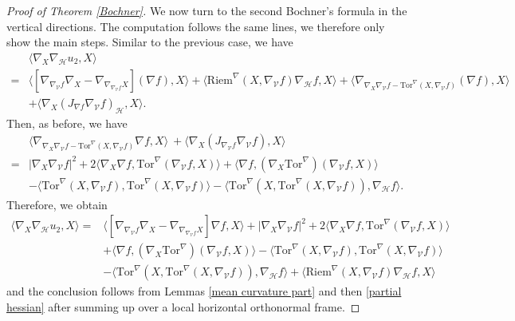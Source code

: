 \documentclass[11pt]{article}
\numberwithin{equation}{section}
\newcommand{\Ho}{\mathcal H}
\newcommand{\V}{\mathcal V}
\newcommand{\Tor}{\mathrm{Tor}}
\begin{document}
\begin{proof}[Proof of Theorem \ref{Bochner}]
        
        We now turn to the second Bochner's formula in the vertical directions. The computation follows the same lines, we therefore only show the main steps.  Similar to the previous case, we have
		\begin{align*}
			&\langle \nabla_X \nabla_{\mathcal{H}}u_2 ,X \rangle\\
			=&\langle[\nabla_{\nabla_\mathcal{V}f} \nabla_X-\nabla_{\nabla_{\nabla_\mathcal{V}f} X}] (\nabla f), X \rangle+\langle\mathrm{Riem}^{\nabla}(X, \nabla_{\mathcal{V}} f) \nabla_\Ho f, X\rangle+\langle \nabla_{\nabla_X \nabla_\mathcal{V}f-\Tor^{\nabla}(X, \nabla_\mathcal{V}f) } (\nabla f), X \rangle\\
			&+\langle \nabla_X (J_{\nabla f}\nabla_\mathcal{V}f)_{\mathcal{H}}, X \rangle.
		\end{align*} 
		Then, as before, we have
		\begin{align*}
			& \langle \nabla_{\nabla_X \nabla_\mathcal{V}f-\Tor^{\nabla}(X, \nabla_\mathcal{V}f) } \nabla f, X \rangle\
			+\langle \nabla_X (J_{\nabla_\V f}\nabla_\mathcal{V}f), X \rangle \\
			=&|\nabla_X \nabla_\mathcal{V}f  |^2+2\langle \nabla_X \nabla f, \Tor^\nabla(\nabla_{\mathcal{V}}f, X) \rangle+\langle \nabla f, (\nabla_X \Tor^\nabla)(\nabla_{\mathcal{V}}f, X) \rangle \\
			&-\langle \Tor^{\nabla}(X, \nabla_\mathcal{V}f) ,\Tor^{\nabla}(X, \nabla_\mathcal{V}f)\rangle-\langle \Tor^\nabla(X, \Tor^{\nabla}(X, \nabla_\mathcal{V}f) ), \nabla_\Ho f \rangle.
		\end{align*}
		Therefore, we obtain
		\begin{align*}
			\langle \nabla_X \nabla_{\mathcal{H}}u_2 ,X \rangle=&\langle[\nabla_{\nabla_\mathcal{V}f} \nabla_X-\nabla_{\nabla_{\nabla_\mathcal{V}f} X}] \nabla f, X \rangle +|\nabla_X \nabla_\mathcal{V}f  |^2+2\langle \nabla_X \nabla f, \Tor^\nabla(\nabla_{\mathcal{V}}f, X) \rangle \\
			&+\langle \nabla f, (\nabla_X \Tor^\nabla)(\nabla_{\mathcal{V}}f, X) \rangle  -\langle \Tor^{\nabla}(X, \nabla_\mathcal{V}f) ,\Tor^{\nabla}(X, \nabla_\mathcal{V}f)\rangle \\
             &-\langle \Tor^\nabla(X, \Tor^{\nabla}(X, \nabla_\mathcal{V}f) ), \nabla_\Ho f \rangle+\langle\mathrm{Riem}^{\nabla}(X, \nabla_{\mathcal{V}} f) \nabla_\Ho f, X\rangle
		\end{align*}
		and the conclusion follows from Lemmas \ref{mean curvature part} and then  \ref{partial hessian} after summing up over a local horizontal orthonormal frame.
	\end{proof}
\end{document}
